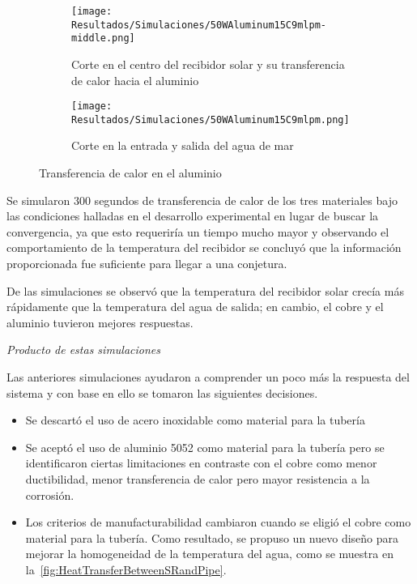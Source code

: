 				\begin{figure}[H]
					\centering
					\begin{subfigure}[t]{\linewidth}
						\centering
						\texttt{[image: Resultados/Simulaciones/50WAluminum15C9mlpm-middle.png]}
						\caption{Corte en el centro del recibidor solar y su transferencia de calor hacia el aluminio}
						\label{fig:50WAluminum15C9mlpm-middle}
					\end{subfigure}
					\hfill
					\begin{subfigure}[t]{\linewidth}
						\centering
						\texttt{[image: Resultados/Simulaciones/50WAluminum15C9mlpm.png]}
						\caption{Corte en la entrada y salida del agua de mar}
						\label{fig:50WAluminum15C9mlpm}
					\end{subfigure}
					\hfill
					\caption{Transferencia de calor en el aluminio}
					\label{fig:aluminum-heat-transfer}
				\end{figure}
				
				Se simularon 300 segundos de transferencia de calor de los tres materiales bajo las condiciones halladas en el desarrollo experimental en lugar de buscar la convergencia, ya que esto requeriría un tiempo mucho mayor y observando el comportamiento de la temperatura del recibidor se concluyó que la información proporcionada fue suficiente para llegar a una conjetura.
				
				De las simulaciones se observó que la temperatura del recibidor solar crecía más rápidamente que la temperatura del agua de salida; en cambio, el cobre y el aluminio tuvieron mejores respuestas.
				
				\textit{Producto de estas simulaciones}
				
				Las anteriores simulaciones ayudaron a comprender un poco más la respuesta del sistema y con base en ello se tomaron las siguientes decisiones.
				
				\begin{itemize}
					\item Se descartó el uso de acero inoxidable como material para la tubería
					\item Se aceptó el uso de aluminio 5052 como material para la tubería pero se identificaron ciertas limitaciones en contraste con el cobre como menor ductibilidad, menor transferencia de calor pero mayor resistencia a la corrosión.
					\item Los criterios de manufacturabilidad cambiaron cuando se eligió el cobre como material para la tubería. Como resultado, se propuso un nuevo diseño para mejorar la homogeneidad de la temperatura del agua, como se muestra en la~\cref{fig:HeatTransferBetweenSRandPipe}.
				\end{itemize}
				
